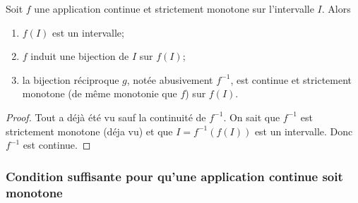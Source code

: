 \begin{theo}
  Soit $f$ une application continue et strictement monotone sur l'intervalle $I$. Alors
  \begin{enumerate}
  \item $f(I)$ est un intervalle;
  \item $f$ induit une bijection de $I$ sur $f(I)$;
  \item la bijection réciproque $g$, notée abusivement $f^{-1}$, est continue et strictement monotone (de même monotonie que $f$) sur $f(I)$.
  \end{enumerate}
\end{theo}
\begin{proof}
  Tout a déjà été vu sauf la continuité de $f^{-1}$. On sait que $f^{-1}$ est strictement monotone (déja vu) et que $I=f^{-1}(f(I))$ est un intervalle. Donc $f^{-1}$ est continue.
\end{proof}

\subsubsection[Pour qu'une application continue soit monotone]{Condition suffisante pour qu'une application continue soit monotone}

